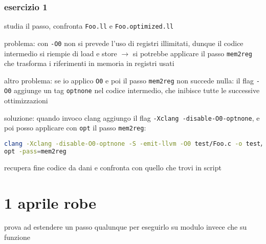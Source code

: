 \section{esercizio 1}

studia il passo, confronta \lstinline|Foo.ll| e \lstinline|Foo.optimized.ll|

\begin{emphasize-blue}
    problema: con \lstinline|-O0| non si prevede l'uso di registri illimitati, dunque il codice intermedio si riempie di load e store $\rightarrow$ si potrebbe applicare il passo \lstinline|mem2reg| che trasforma i riferimenti in memoria in registri usati

    altro problema: se io applico \lstinline|O0| e poi il passo \lstinline|mem2reg| non succede nulla: il flag \lstinline|-O0| aggiunge un tag \lstinline|optnone| nel codice intermedio, che inibisce tutte le successive ottimizzazioni

    soluzione: quando invoco clang aggiungo il flag \lstinline|-Xclang -disable-O0-optnone|, e poi posso applicare con \lstinline|opt| il passo \lstinline|mem2reg|:
    \begin{lstlisting}[language=bash]
clang -Xclang -disable-O0-optnone -S -emit-llvm -O0 test/Foo.c -o test/Foo.ll
opt -pass=mem2reg \end{lstlisting}
   
recupera fine codice da dani e confronta con quello che trovi in script
\end{emphasize-blue}

\part{1 aprile robe}

prova ad estendere un passo qualunque per eseguirlo su modulo invece che su funzione



